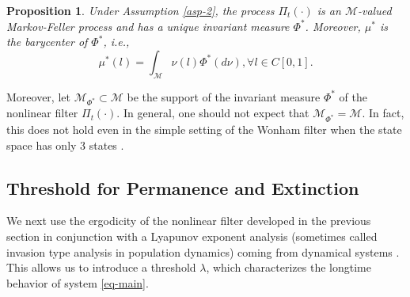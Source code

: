 \documentclass[12pt]{amsart}
\newtheorem{pron}{Proposition}[section]
\theoremstyle{remark}
\numberwithin{equation}{section}
\newcommand{\M}{\mathcal{M}}
\numberwithin{equation}{section}
\newcommand{\1}{\boldsymbol{1}}
\begin{document}
\begin{pron}
	Under Assumption \ref{asp-2}, the process $\Pi_t(\cdot)$ is an $\M$-valued Markov-Feller process and has a unique invariant measure $\Phi^*$. Moreover, $\mu^*$ is the barycenter of $\Phi^*$, i.e.,
	$$
	\mu^*(l)=\int_{\M} \nu(l)\Phi^*(d\nu), \forall l\in C[0,1].
	$$
\end{pron}

Moreover, let $\M_{\Phi^*}\subset\M$ be the support of the invariant measure $\Phi^*$ of the nonlinear filter $\Pi_t(\cdot)$. In general, one should not expect that $\M_{\Phi^*}=\M$. In fact, this does not hold even in the simple setting of the Wonham filter when the state space has only 3 states \cite[Section 4]{TW11}.

\subsection{Threshold for Permanence and Extinction}\label{sec:lambda}
We next use the ergodicity of the nonlinear filter developed in the previous section in conjunction with a Lyapunov exponent analysis (sometimes called invasion type analysis in population dynamics) coming from dynamical systems \cite{DANG,DN-JDE,HN18}. This allows us to introduce a threshold $\lambda$, which characterizes the longtime behavior of system \eqref{eq-main}.
\end{document}
